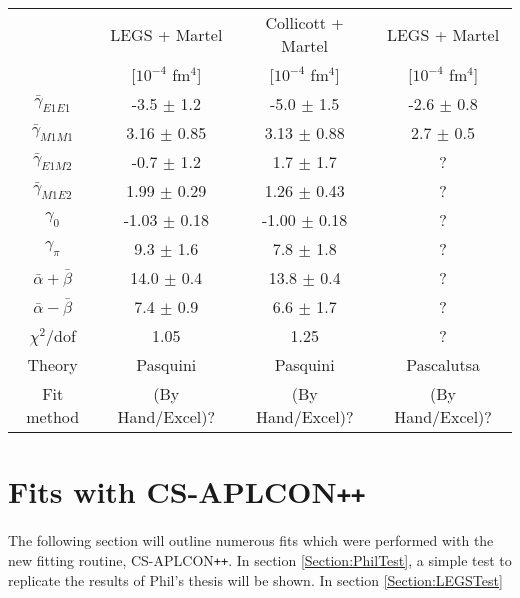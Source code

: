\documentclass[]{article}
\begin{document}
\begin{table}[h!]
	\centering %
	\begin{tabular}{|c|c|c|c|} %
		\hline %
		& LEGS + Martel & Collicott + Martel & LEGS + Martel\\
		& [$10^{-4}$ fm$^{4}$] & [$10^{-4}$ fm$^{4}$] & [$10^{-4}$ fm$^{4}$]\\
		\hline\hline
		$\bar{\gamma}_{E1E1}$ & -3.5 $\pm$ 1.2 				& -5.0 $\pm$ 1.5 \hspace{1mm} & -2.6 $\pm$ 0.8 \\
		$\bar{\gamma}_{M1M1}$ & \hspace{1mm}3.16 $\pm$ 0.85 	& 3.13 $\pm$ 0.88 & 2.7 $\pm$ 0.5 \\
		$\bar{\gamma}_{E1M2}$ & -0.7 $\pm$ 1.2 				& 1.7 $\pm$ 1.7 & ?\\
		$\bar{\gamma}_{M1E2}$ & \hspace{1mm}1.99 $\pm$ 0.29 	& 1.26 $\pm$ 0.43 & ?\\
		\hline
		$\gamma_{0}$ 	& -1.03 $\pm$ 0.18 				& -1.00 $\pm$ 0.18\hspace{1.5mm} & ?\\
		$\gamma_{\pi}$ 	& \hspace{1mm}9.3 $\pm$ 1.6 	& 7.8 $\pm$ 1.8 & ?\\%
		$\bar{\alpha} + \bar{\beta}$ & 14.0 $\pm$ 0.4 	& 13.8 $\pm$ 0.4\hspace{1mm} & ?\\
		$\bar{\alpha} - \bar{\beta}$ & \hspace{1mm}7.4 $\pm$ 0.9 	& 6.6 $\pm$ 1.7 & ?\\[0.5ex]
		\hline %
		$\chi^{2}$/dof & 1.05 & 1.25 & ?\\[0.5ex]
		\hline
		Theory & Pasquini & Pasquini & Pascalutsa\\[0.5ex]
		Fit method & (By Hand/Excel)? & (By Hand/Excel)? & (By Hand/Excel)? \\[0.5ex]
		\hline
	\end{tabular}
\end{table}
%

\section{Fits with CS-APLCON\texttt{++}}

The following section will outline numerous fits which were performed with the new fitting routine, CS-APLCON\texttt{++}. In section \ref{Section:PhilTest}, a simple test to replicate the results of Phil's thesis will be shown. In section \ref{Section:LEGSTest}
\end{document}
